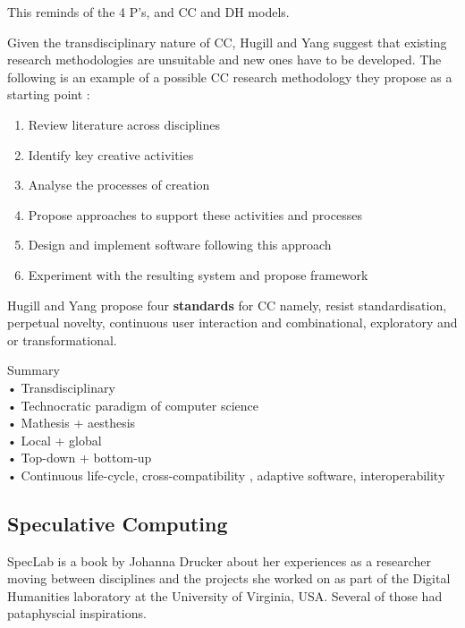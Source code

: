 \begin{draft}
  This reminds of the 4 P’s, and CC and DH models.
\end{draft}

Given the transdisciplinary nature of CC, Hugill and Yang suggest that existing research methodologies are unsuitable and new ones have to be developed. The following is an example of a possible CC research methodology they propose as a starting point \citep[p.17]{Hugill2013c}:

\begin{enumerate}
  \item Review literature across disciplines
  \item Identify key creative activities
  \item Analyse the processes of creation
  \item Propose approaches to support these activities and processes
  \item Design and implement software following this approach
  \item Experiment with the resulting system and propose framework
\end{enumerate}

Hugill and Yang propose four \textbf{standards} for CC \citep[p.17]{Hugill2013c} namely, resist standardisation, perpetual novelty, continuous user interaction and combinational, exploratory and or transformational.

\begin{shaded}
  Summary\\
  •	Transdisciplinary\\
  •	Technocratic paradigm of computer science\\
  •	Mathesis + aesthesis\\
  •	Local + global\\
  •	Top-down + bottom-up\\
  •	Continuous life-cycle, cross-compatibility , adaptive software, interoperability
\end{shaded}

\subsection{Speculative Computing}

SpecLab \citep{Drucker2009} is a book by Johanna Drucker about her experiences as a researcher moving between disciplines and the projects she worked on as part of the Digital Humanities laboratory at the University of Virginia, USA. Several of those had pataphyscial inspirations.

